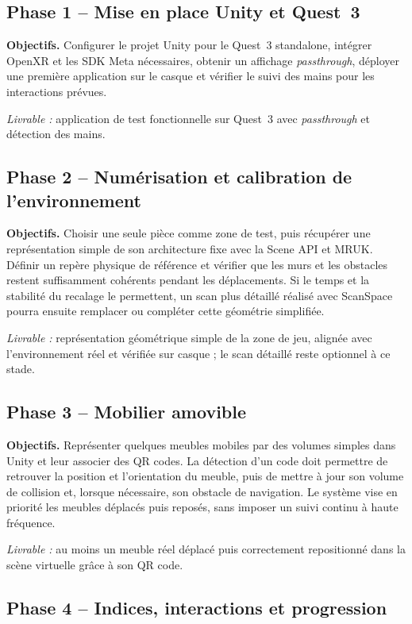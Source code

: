 \documentclass[11pt,a4paper]{article}
\begin{document}
\subsection*{Phase 1 -- Mise en place Unity et Quest~3}

\textbf{Objectifs.} Configurer le projet Unity pour le Quest~3 standalone, intégrer OpenXR et les SDK Meta nécessaires, obtenir un affichage \emph{passthrough}, déployer une première application sur le casque et vérifier le suivi des mains pour les interactions prévues.

\textit{Livrable :} application de test fonctionnelle sur Quest~3 avec \emph{passthrough} et détection des mains.

\subsection*{Phase 2 -- Numérisation et calibration de l'environnement}

\textbf{Objectifs.} Choisir une seule pièce comme zone de test, puis récupérer une représentation simple de son architecture fixe avec la Scene API et MRUK. Définir un repère physique de référence et vérifier que les murs et les obstacles restent suffisamment cohérents pendant les déplacements. Si le temps et la stabilité du recalage le permettent, un scan plus détaillé réalisé avec ScanSpace pourra ensuite remplacer ou compléter cette géométrie simplifiée.

\textit{Livrable :} représentation géométrique simple de la zone de jeu, alignée avec l'environnement réel et vérifiée sur casque ; le scan détaillé reste optionnel à ce stade.

\subsection*{Phase 3 -- Mobilier amovible}

\textbf{Objectifs.} Représenter quelques meubles mobiles par des volumes simples dans Unity et leur associer des QR codes. La détection d'un code doit permettre de retrouver la position et l'orientation du meuble, puis de mettre à jour son volume de collision et, lorsque nécessaire, son obstacle de navigation. Le système vise en priorité les meubles déplacés puis reposés, sans imposer un suivi continu à haute fréquence.

\textit{Livrable :} au moins un meuble réel déplacé puis correctement repositionné dans la scène virtuelle grâce à son QR code.

\subsection*{Phase 4 -- Indices, interactions et progression}
\end{document}
